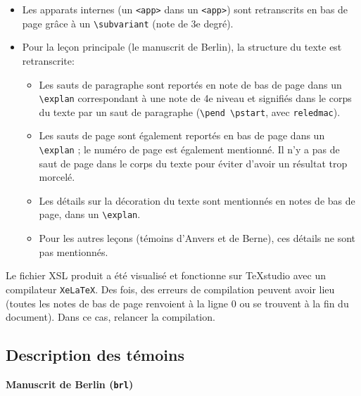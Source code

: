 \documentclass[12pt, a4paper]{article}
\begin{document}
\begin{itemize}
{			les \texttt{<rdgGrp>} qui contiennent seulement des 
			\texttt{<rdg>}, mais pas de \texttt{<lem>}) se trouvent 
			dans une note de deuxième niveau (\texttt{\textbackslash group}, en \LaTeX). Si un 
			\texttt{<rdgGrp>} contient une partie du témoin principal, il n'est 
			pas retranscrit en \LaTeX.}
		\item{Les apparats internes (un \texttt{<app>} dans un 
			\texttt{<app>}) sont retranscrits en bas de page grâce à un 
			\texttt{\textbackslash subvariant} (note de 3e degré).}
		\item{Pour la leçon principale (le manuscrit de Berlin), la structure du 
			texte est retranscrite:}
		\begin{itemize}
			\item{Les sauts de paragraphe sont reportés en note de 
				bas de page dans un \texttt{\textbackslash explan} correspondant à une note de 4e niveau 
				et signifiés dans le corps du texte par un saut de paragraphe 
				(\texttt{\textbackslash pend \textbackslash pstart}, avec \texttt{reledmac}).} 
			\item{Les sauts de page sont également reportés en bas de page dans un 
				\texttt{\textbackslash explan} ; le numéro de page est également mentionné. Il n'y a 
				pas de saut de page dans le corps du texte pour éviter d'avoir un résultat 
				trop morcelé.}
			\item{Les détails sur la décoration du texte sont mentionnés en notes de 
				bas de page, dans un \texttt{\textbackslash explan}.}
			\item{Pour les autres leçons (témoins d'Anvers et de Berne), ces 
				détails ne sont pas mentionnés.}
		\end{itemize}
	\end{itemize} 
	
	\indent Le fichier XSL produit a été visualisé et fonctionne sur TeXstudio 
	avec un compilateur \texttt{XeLaTeX}. Des fois, des erreurs de compilation 
	peuvent avoir lieu (toutes les notes de bas de page renvoient à la ligne 0 
	ou se trouvent à la fin du document). Dans ce cas, relancer la compilation.
	
	\subsection{Description des témoins}
	\noindent \textbf{Manuscrit de Berlin (\texttt{brl})}\\
	
\end{document}
